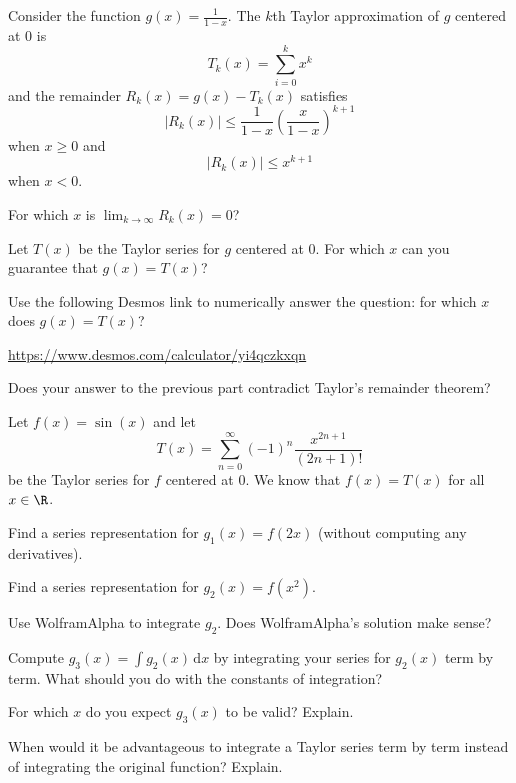 \documentclass{workbook}
\begin{document}
\begin{slide}
	\question
	Consider the function $g(x)=\frac{1}{1-x}$. The $k$th Taylor approximation
	of $g$ centered at $0$ is
	\[
		T_k(x)=\sum_{i=0}^k x^k
	\]
	and the remainder $R_k(x)=g(x)-T_k(x)$ satisfies
	\[
		|R_k(x)| \leq \frac{1}{1-x}\left(\frac{x}{1-x}\right)^{k+1}
	\]
	when $x\geq 0$ and
	\[
		|R_k(x)| \leq x^{k+1}
	\]
	when $x< 0$.

	\bigskip
	\bigskip
	\bigskip
	\begin{parts}
		\item For which $x$ is $\lim_{k\to\infty}R_k(x)=0$?

		\item Let $T(x)$ be the Taylor series for $g$ centered at $0$.
		For which $x$ can you guarantee that $g(x)=T(x)$?

		\item Use the following Desmos link to numerically answer the question: for which $x$ does $g(x)=T(x)$?

		{\small\url{https://www.desmos.com/calculator/yi4qczkxqn}}

		\item Does your answer to the previous part contradict Taylor's remainder theorem?

	\end{parts}
\end{slide}

\begin{slide}
	\question
	Let $f(x)=\sin(x)$ and let
	\[
		T(x)=\sum_{n=0}^\infty (-1)^{n}\frac{x^{2n+1}}{(2n+1)!}
	\]
	be the Taylor series for $f$ centered at $0$. We know that
	$f(x)=T(x)$ for all $x\in \R$.

	\begin{parts}
		\item Find a series representation for $g_1(x)=f(2x)$ (without
		computing any derivatives).
		\item Find a series representation for $g_2(x)=f(x^2)$.
		\item Use WolframAlpha to integrate $g_2$. Does WolframAlpha's solution make sense?
		\item Compute $g_3(x)=\displaystyle \int g_2(x)\,\mathrm d x$ by integrating your series for $g_2(x)$ term by term. What should you do with the constants of integration?
		\item For which $x$ do you expect $g_3(x)$ to be valid? Explain.
		\item When would it be advantageous to integrate a Taylor series term by term instead of integrating the original function? Explain.
	\end{parts}
\end{slide}
\end{document}

